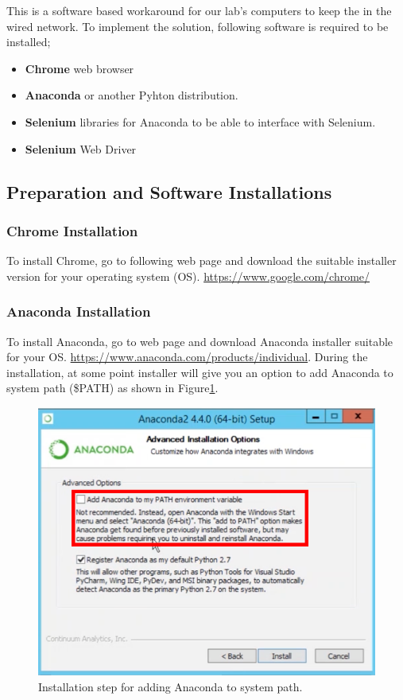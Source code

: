 This is a software based workaround for our lab's computers to keep the in the
wired network. To implement the solution, following software is required to be
installed;

\begin{itemize}
 \item \textbf{Chrome} web browser
 \item \textbf{Anaconda} or another Pyhton distribution. 
 \item \textbf{Selenium} libraries for Anaconda to be able to interface with Selenium.
 \item \textbf{Selenium} Web Driver
\end{itemize}

\subsection{Preparation and Software Installations}
\subsubsection{Chrome Installation}
To install Chrome, go to following web page and download the suitable installer version
for your operating system (OS). 
\url{https://www.google.com/chrome/}

\subsubsection{Anaconda Installation}
To install Anaconda, go to web page and download Anaconda installer suitable for your  
OS. \url{https://www.anaconda.com/products/individual}. During the installation, at some
point installer will give you an option to add Anaconda to system path (\$PATH) as
shown in Figure\ref{fig:AnacondaInstall}.

\begin{figure}[H]
    \centering
	\includegraphics[angle=0,origin=c,width = .8\linewidth]{Section_Ethernet/Figures/Anaconda_PATH.png}
    \caption{Installation step for adding Anaconda to system path.}
    \label{fig:AnacondaInstall}
\end{figure}

